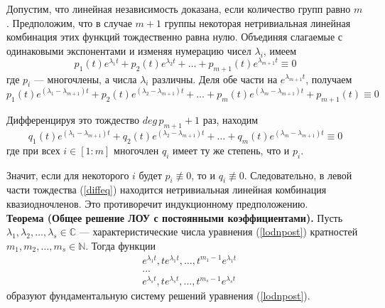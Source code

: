 \documentclass{article}
\begin{document}
Допустим, что линейная независимость доказана, если количество групп равно $m$. Предположим, что в случае $m + 1$ группы некоторая нетривиальная линейная комбинация этих функций тождественно равна нулю. Объединяя слагаемые с одинаковыми экспонентами и изменяя нумерацию чисел $\lambda_i$, имеем
\begin{equation*}
    p_1(t)e^{\lambda_1 t} + p_2(t)e^{\lambda_2 t} + \ldots + p_{m+1}(t)e^{\lambda_{m+1}t} \equiv 0
\end{equation*}
где $p_i$ --- многочлены, а числа $\lambda_i$ различны. Деля обе части на $e^{\lambda_{m+1}t}$, получаем
\begin{equation*}
    p_1(t)e^{(\lambda_1 - \lambda_{m+1}) t} + p_2(t)e^{(\lambda_2 - \lambda_{m+1}) t} + \ldots + p_m(t)e^{(\lambda_m - \lambda_{m+1}) t} + p_{m+1}(t) \equiv 0
\end{equation*}

Дифференцируя это тождество $deg\, p_{m+1} + 1$ раз, находим
\begin{equation}
    q_1(t)e^{(\lambda_1 - \lambda_{m+1}) t} + q_2(t)e^{(\lambda_2 - \lambda_{m+1}) t} + \ldots + q_m(t)e^{(\lambda_m - \lambda_{m+1}) t} \equiv 0 \label{diffeq}
\end{equation}
где при всех $i \in [1:m]$ многочлен $q_i$ имеет ту же степень, что и $p_i$.

Значит, если для некоторого $i$ будет $p_i \not\equiv 0$, то и $q_i \not\equiv 0$. Следовательно, в левой части тождества (\ref{diffeq}) находится нетривиальная линейная комбинация квазиодночленов. Это противоречит индукционному предположению.\\

\noindent \textbf{Теорема (Общее решение ЛОУ с постоянными коэффициентами).} Пусть $\lambda_1, \lambda_2, \ldots, \lambda_s \in \mathbb{C}$ --- характеристические числа уравнения (\ref{lodnpost}) кратностей $m_1, m_2, \ldots, m_s \in \mathbb{N}$. Тогда функции
\begin{equation}
    \begin{aligned}
        &e^{\lambda_1 t}, te^{\lambda_1 t}, \ldots, t^{m_1 - 1}e^{\lambda_1 t}\\
        &\ldots\\
        &e^{\lambda_s t}, te^{\lambda_s t}, \ldots, t^{m_s - 1}e^{\lambda_s t}
    \end{aligned} \label{fundsyst}
\end{equation}
образуют фундаментальную систему решений уравнения (\ref{lodnpost}).\\
\end{document}
